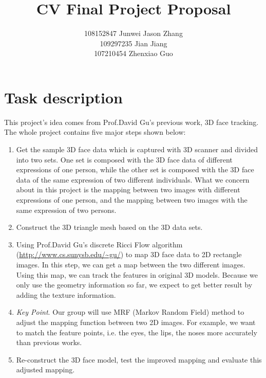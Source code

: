 \documentclass[11pt]{article}
\author{108152847 Junwei Jason Zhang \\ 109297235 Jian Jiang \\107210454 Zhenxiao Guo}
\title{CV Final Project Proposal}
\begin{document}
\maketitle
\section{Task description}
This project's idea  comes from Prof.David Gu's previous work, 3D face tracking. The whole project contains five major steps shown below:
\begin{enumerate}
\item
Get the sample 3D face data which is captured with 3D scanner and divided into two sets. One set is composed with the 3D face data of different expressions of one person, while the other set is composed with the 3D face data of the same expression of two different individuals. What we concern about in this project is the mapping between two images with different expressions of one person, and the mapping between two images with the same expression of two persons.
\item
Construct the 3D triangle mesh based on the 3D data sets.
\item
Using Prof.David Gu's discrete Ricci Flow algorithm (\url{http://www.cs.sunysb.edu/~gu/}) to map 3D face data to 2D rectangle images. In this step, we can get a map between the two different images. Using this map, we can track the features in original 3D models. Because we only use the geometry information so far, we expect to get better result by adding the texture information.
\item \emph{Key Point}.
Our group will use MRF (Markov Random Field) method to adjust the mapping function between two 2D images. For example, we want to match the feature points, i.e. the eyes, the lips, the noses more accurately than previous works.
\item
Re-construct the 3D face model, test the improved mapping and evaluate this adjusted mapping.
\end{enumerate}
\end{document}
